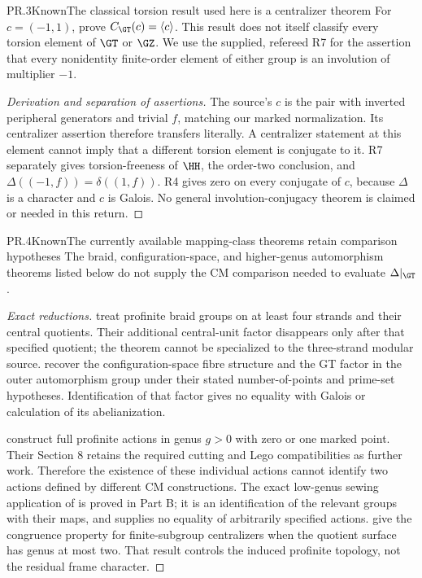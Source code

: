 \begin{statement}{PR.3}{Known}{The classical torsion result used here is a centralizer theorem}
For $c=(-1,1)$, \citet[Proposition 4(ii)]{LitLochakSchneps1997}
prove $C_{\GT}(c)=\langle c\rangle$. This result does not itself
classify every torsion element of $\GT$ or $\GZ$. We use the supplied,
refereed R7 for the assertion that every nonidentity finite-order
element of either group is an involution of multiplier $-1$.
\end{statement}
\begin{proof}[Derivation and separation of assertions]
The source's $c$ is the pair with inverted peripheral generators and
trivial $f$, matching our marked normalization. Its centralizer assertion
therefore transfers literally. A centralizer statement at this element
cannot imply that a different torsion element is conjugate to it.
R7 separately gives torsion-freeness of $\HH$, the order-two conclusion,
and $\Delta((-1,f))=\delta((1,f))$. R4 gives zero on every conjugate
of $c$, because $\Delta$ is a character and $c$ is Galois. No general
involution-conjugacy theorem is claimed or needed in this return.
\end{proof}

\begin{statement}{PR.4}{Known}{The currently available mapping-class theorems retain comparison hypotheses}
The braid, configuration-space, and higher-genus automorphism theorems
listed below do not supply the CM comparison needed to evaluate
$\Delta|_{\GT}$.
\end{statement}
\begin{proof}[Exact reductions]
\citet[Theorems A and B]{LitMinamideNakamura2022} treat profinite braid
groups on at least four strands and their central quotients. Their
additional central-unit factor disappears only after that specified
quotient; the theorem cannot be specialized to the three-strand modular
source. \citet[Corollaries B and C]{LitHoshiMinamideMochizuki2022}
recover the configuration-space fibre structure and the GT factor in
the outer automorphism group under their stated number-of-points and
prime-set hypotheses. Identification of that factor gives no equality
with Galois or calculation of its abelianization.

\citet[Theorem 1.1]{LitLochakNakamuraSchneps2026} construct full
profinite actions in genus $g>0$ with zero or one marked point.
Their Section 8 retains the required cutting and Lego compatibilities
as further work. Therefore the existence of these individual actions
cannot identify two actions defined by different CM constructions.
The exact low-genus sewing application of
\citet[Theorem 2.3 and Proposition 2.6(i)]{LitBoggi2026v6} is proved
in Part B; it is an identification of the relevant groups with their
maps, and supplies no equality of arbitrarily specified actions.
\citet[Theorem A and Corollary B]{BoggiSymmetric2026} give the
congruence property for finite-subgroup centralizers when the quotient
surface has genus at most two. That result controls the induced
profinite topology, not the residual frame character.
\end{proof}

